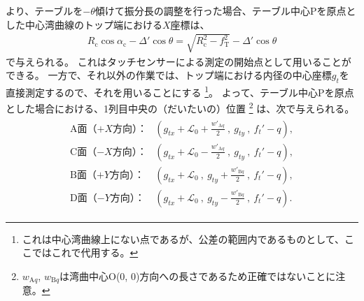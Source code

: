 \clearpage
より、テーブルを$-\theta$傾けて振分長の調整を行った場合、テーブル中心Pを原点とした中心湾曲線のトップ端における$X$座標は、
\begin{align*}
  R_\mathrm c\cos\alpha_\mathrm c-\varDelta'\cos\theta = \sqrt{R_\mathrm c^2-f_\mathrm T^2}-\varDelta'\cos\theta
\end{align*}
で与えられる。
これはタッチセンサーによる測定の開始点として用いることができる。
一方で、それ以外の作業では、トップ端における内径の中心座標$g_t$を直接測定するので、それを用いることにする
\footnote{これは中心湾曲線上にない点であるが、公差の範囲内であるものとして、ここではこれで代用する。}。
よって、テーブル中心Pを原点とした場合における、\dimple1列目中央の（だいたいの）位置
\footnote{$w_{\mathrm Aq}$, $w_{\mathrm Bq}$は湾曲中心O(0, 0)方向への長さであるため正確ではないことに注意。}\relax
は、次で与えられる。
\begin{align*}
\begin{array}{rl}
  \text{A面（$+X$方向）：}
  & \displaystyle
    \left(
      g_{tx}+\mathcal L_0+\frac{w'_{\mathrm Aq}}2~,~
      g_{ty}~,~
      f_t'-q
    \right),\\[12pt]
  \text{C面（$-X$方向）：}
  & \displaystyle
    \left(
      g_{tx}+\mathcal L_0-\frac{w'_{\mathrm Aq}}2~,~
      g_{ty}~,~
      f_t'-q
    \right),\\[12pt]
  \text{B面（$+Y$方向）：}
  & \displaystyle
    \left(
      g_{tx}+\mathcal L_0~,~
      g_{ty}+\frac{w'_{\mathrm Bq}}2~,~
      f_t'-q
    \right),\\[12pt]
  \text{D面（$-Y$方向）：}
  & \displaystyle
    \left(
      g_{tx}+\mathcal L_0~,~
      g_{ty}-\frac{w'_{\mathrm Bq}}2~,~
      f_t'-q
    \right).
\end{array}
\end{align*}
